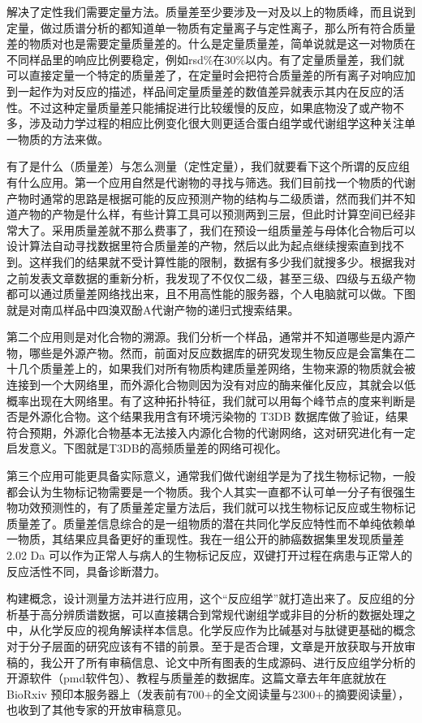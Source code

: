 \documentclass[
]{book}
\begin{document}
解决了定性我们需要定量方法。质量差至少要涉及一对及以上的物质峰，而且说到定量，做过质谱分析的都知道单一物质有定量离子与定性离子，那么所有符合质量差的物质对也是需要定量质量差的。什么是定量质量差，简单说就是这一对物质在不同样品里的响应比例要稳定，例如rsd\%在30\%以内。有了定量质量差，我们就可以直接定量一个特定的质量差了，在定量时会把符合质量差的所有离子对响应加到一起作为对反应的描述，样品间定量质量差的数值差异就表示其内在反应的活性。不过这种定量质量差只能捕捉进行比较缓慢的反应，如果底物没了或产物不多，涉及动力学过程的相应比例变化很大则更适合蛋白组学或代谢组学这种关注单一物质的方法来做。

有了是什么（质量差）与怎么测量（定性定量），我们就要看下这个所谓的反应组有什么应用。第一个应用自然是代谢物的寻找与筛选。我们目前找一个物质的代谢产物时通常的思路是根据可能的反应预测产物的结构与二级质谱，然而我们并不知道产物的产物是什么样，有些计算工具可以预测两到三层，但此时计算空间已经非常大了。采用质量差就不那么费事了，我们在预设一组质量差与母体化合物后可以设计算法自动寻找数据里符合质量差的产物，然后以此为起点继续搜索直到找不到。这样我们的结果就不受计算性能的限制，数据有多少我们就搜多少。根据我对之前发表文章数据的重新分析，我发现了不仅仅二级，甚至三级、四级与五级产物都可以通过质量差网络找出来，且不用高性能的服务器，个人电脑就可以做。下图就是对南瓜样品中四溴双酚A代谢产物的递归式搜索结果。

第二个应用则是对化合物的溯源。我们分析一个样品，通常并不知道哪些是内源产物，哪些是外源产物。然而，前面对反应数据库的研究发现生物反应是会富集在二十几个质量差上的，如果我们对所有物质构建质量差网络，生物来源的物质就会被连接到一个大网络里，而外源化合物则因为没有对应的酶来催化反应，其就会以低概率出现在大网络里。有了这种拓扑特征，我们就可以用每个峰节点的度来判断是否是外源化合物。这个结果我用含有环境污染物的 T3DB 数据库做了验证，结果符合预期，外源化合物基本无法接入内源化合物的代谢网络，这对研究进化有一定启发意义。下图就是T3DB的高频质量差的网络可视化。

第三个应用可能更具备实际意义，通常我们做代谢组学是为了找生物标记物，一般都会认为生物标记物需要是一个物质。我个人其实一直都不认可单一分子有很强生物功效预测性的，有了质量差定量方法后，我们就可以找生物标记反应或生物标记质量差了。质量差信息综合的是一组物质的潜在共同化学反应特性而不单纯依赖单一物质，其结果应具备更好的重现性。我在一组公开的肺癌数据集里发现质量差 2.02 Da 可以作为正常人与病人的生物标记反应，双键打开过程在病患与正常人的反应活性不同，具备诊断潜力。

构建概念，设计测量方法并进行应用，这个``反应组学''就打造出来了。反应组的分析基于高分辨质谱数据，可以直接耦合到常规代谢组学或非目的分析的数据处理之中，从化学反应的视角解读样本信息。化学反应作为比碱基对与肽键更基础的概念对于分子层面的研究应该有不错的前景。至于是否合理，文章是开放获取与开放审稿的，我公开了所有审稿信息、论文中所有图表的生成源码、进行反应组学分析的开源软件（pmd软件包）、教程与质量差的数据库。这篇文章去年年底就放在 BioRxiv 预印本服务器上（发表前有700+的全文阅读量与2300+的摘要阅读量），也收到了其他专家的开放审稿意见。
\end{document}
